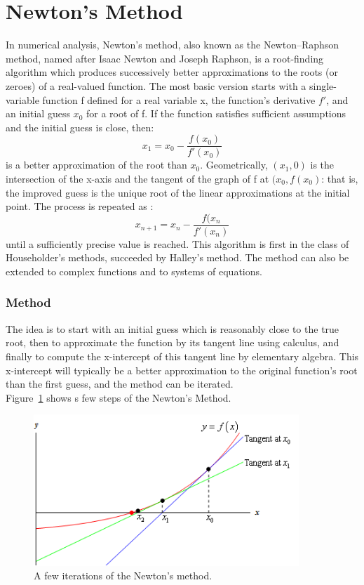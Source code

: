 \documentclass[a4paper, 12pt]{report}
\begin{document}
    \section{Newton's Method}
    In numerical analysis, Newton's method, also known as the Newton–Raphson method, named after Isaac Newton and Joseph Raphson, is a root-finding algorithm which produces successively better approximations to the roots (or zeroes) of a real-valued function. The most basic version starts with a single-variable function f defined for a real variable x, the function's derivative $f'$, and an initial guess $x_{0}$ for a root of f. If the function satisfies sufficient assumptions and the initial guess is close, then:
    \begin{equation}
      x_{1} = x_{0} - \frac{f(x_{0})}{f'(x_{0})}
    \end{equation}
    is a better approximation of the root than $x_{0}$. Geometrically, $(x_{1},0)$ is the intersection of the x-axis and the tangent of the graph of f at $(x_{0},f(x_{0})$: that is, the improved guess is the unique root of the linear approximations at the initial point. The process is repeated as :
    \begin{equation}
        x_{n+1} = x_{n} - \frac{f(x_{n}}{f'(x_{n})}
    \end{equation}
    until a sufficiently precise value is reached. This algorithm is first in the class of Householder's methods, succeeded by Halley's method. The method can also be extended to complex functions and to systems of equations.
    \subsubsection{Method}
    The idea is to start with an initial guess which is reasonably close to the true root, then to approximate the function by its tangent line using calculus, and finally to compute the x-intercept of this tangent line by elementary algebra. This x-intercept will typically be a better approximation to the original function's root than the first guess, and the method can be iterated.\\
    Figure~\ref{fig:NM} shows s few steps of the Newton's Method.
    \begin{figure}[h]
    \centering
    \includegraphics[width=10cm]{Newton's Method.png}
    \caption{A few iterations of the Newton's method.}
    \label{fig:NM}
    \end{figure}
\end{document}
